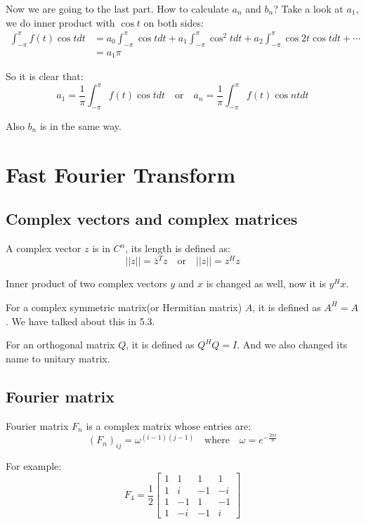 \documentclass[10pt,a4paper,oneside,numbers=noenddot]{scrbook}
\theoremstyle{ctplain}
\theoremstyle{ctresult}
\begin{document}
Now we are going to the last part. How to calculate $a_n$ and $b_n$? Take a look at $a_1$,
we do inner product with $\cos t$ on both sides:
\begin{align*}
  \int_{-\pi}^{\pi} f(t) \cos t dt &= a_0 \int_{-\pi}^{\pi} \cos t dt +
  a_1 \int_{-\pi}^{\pi} \cos^2 t dt +
  a_2 \int_{-\pi}^{\pi} \cos 2t \cos t dt + \cdots \\
  &= a_1 \pi
\end{align*}

So it is clear that:
\[
  a_1 = \frac{1}{\pi} \int_{-\pi}^{\pi} f(t) \cos t dt \quad \text{or} \quad
  a_n = \frac{1}{\pi} \int_{-\pi}^{\pi} f(t) \cos nt dt
\]

Also $b_n$ is in the same way.

\section{Fast Fourier Transform}
\subsection{Complex vectors and complex matrices}

A complex vector $z$ is in $C^n$, its length is defined as:
\[
  ||z|| = \bar{z}^{T} z \quad \text{or} \quad ||z|| = z^{H} z
\]

Inner product of two complex vectors $y$ and $x$ is changed as well, now it is $y^{H} x$.

For a complex symmetric matrix(or Hermitian matrix) $A$, it is defined as $A^{H} = A$.
We have talked about this in 5.3.

For an orthogonal matrix $Q$, it is defined as $Q^{H}Q = I$. And we also changed its name
to unitary matrix.

\subsection{Fourier matrix}

Fourier matrix $F_n$ is a complex matrix whose entries are:
\[
  (F_n)_{ij} = \omega^{(i-1)(j-1)} \quad \text{where} \quad
  \omega = e^{-\frac{2\pi i}{n}}
\]

For example:
\[
  F_4 = \frac12 \begin{bmatrix}
    1 & 1 & 1 & 1 \\
    1 & i & -1 & -i \\
    1 & -1 & 1 & -1 \\
    1 & -i & -1 & i
  \end{bmatrix}
\]
\end{document}
